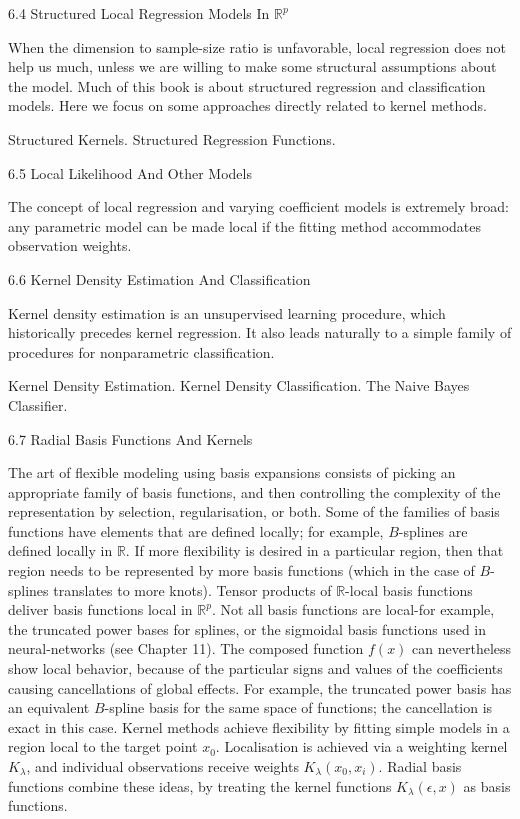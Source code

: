 6.4 Structured Local Regression Models In $\mathbb{R}^p$

When the dimension to sample-size ratio is unfavorable, local regression does not help us much, unless we are willing to make some structural assumptions about the model. Much of this book is about structured regression and classification models. Here we focus on some approaches directly related to kernel methods.

Structured Kernels. Structured Regression Functions.

6.5 Local Likelihood And Other Models

The concept of local regression and varying coefficient models is extremely broad: any parametric model can be made local if the fitting method accommodates observation weights.

6.6 Kernel Density Estimation And Classification

Kernel density estimation is an unsupervised learning procedure, which
historically precedes kernel regression. It also leads naturally to a simple family of procedures for nonparametric classification.

Kernel Density Estimation. Kernel Density Classification. The Naive Bayes Classifier.

6.7 Radial Basis Functions And Kernels

The art of flexible modeling using basis expansions consists of picking an appropriate family of basis functions, and then controlling the complexity of the representation by selection, regularisation, or both. Some of the families of basis functions have elements that are defined locally; for example, $B$-splines are defined locally in $\mathbb{R}$. If more flexibility is desired in a particular region, then that region needs to be represented by more basis functions (which in the case of $B$-splines translates to more knots). Tensor products of $\mathbb{R}$-local basis functions deliver basis functions local in $\mathbb{R}^p$. Not all basis functions are local-for example, the truncated power bases for splines, or the sigmoidal basis functions used in neural-networks (see Chapter 11). The composed function $f(x)$ can nevertheless show local behavior, because of the particular signs and values of the coefficients causing cancellations of global effects. For example, the truncated power basis has an equivalent $B$-spline basis for the same space of functions; the cancellation is exact in this case. Kernel methods achieve flexibility by fitting simple models in a region local to the target point $x_0$. Localisation is achieved via a weighting kernel $K_{\lambda}$, and individual observations receive weights $K_{\lambda}(x_0,x_i)$. Radial basis functions combine these ideas, by treating the kernel functions $K_{\lambda}(\epsilon,x)$ as basis functions.

